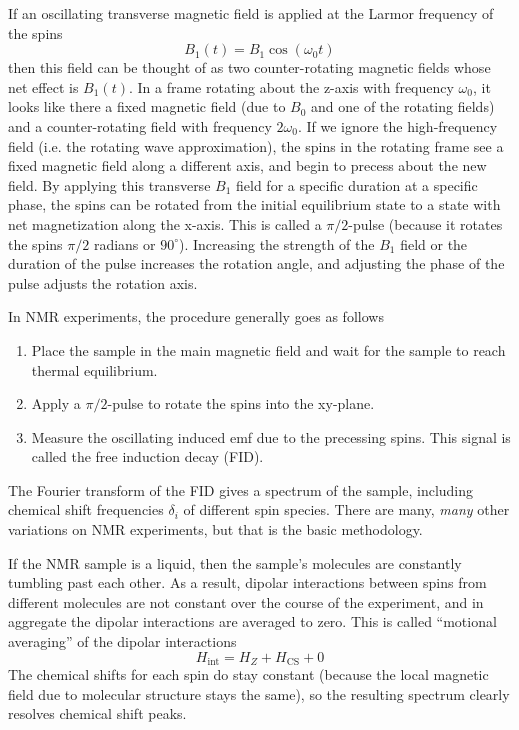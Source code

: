 If an oscillating transverse magnetic field is applied at the Larmor frequency of the spins
\[
B_1(t) = B_1 \cos(\omega_0 t)
\]
then this field can be thought of as two counter-rotating magnetic fields whose net effect is $B_1(t)$. In a frame rotating about the z-axis with frequency $\omega_0$, it looks like there a fixed magnetic field (due to $B_0$ and one of the rotating fields) and a counter-rotating field with frequency $2\omega_0$. If we ignore the high-frequency field (i.e. the rotating wave approximation), the spins in the rotating frame see a fixed magnetic field along a different axis, and begin to precess about the new field. By applying this transverse $B_1$ field for a specific duration at a specific phase,
the spins can be rotated from the initial equilibrium state to a state with net magnetization along the x-axis. This is called a $\pi/2$-pulse (because it rotates the spins $\pi/2$ radians or $90^\circ$). Increasing the strength of the $B_1$ field or the duration of the pulse increases the rotation angle, and adjusting the phase of the pulse adjusts the rotation axis.

In NMR experiments, the procedure generally goes as follows
\begin{enumerate}
    \item Place the sample in the main magnetic field and wait for the sample to reach thermal equilibrium.
    \item Apply a $\pi/2$-pulse to rotate the spins into the xy-plane.
    \item Measure the oscillating induced emf due to the precessing spins. This signal is called the free induction decay (FID).
\end{enumerate}
The Fourier transform of the FID gives a spectrum of the sample, including chemical shift frequencies $\delta_i$ of different spin species. There are many, \emph{many} other variations on NMR experiments, but that is the basic methodology.



If the NMR sample is a liquid, then the sample's molecules are constantly tumbling past each other. As a result, dipolar interactions between spins from different molecules are not constant over the course of the experiment, and in aggregate the dipolar interactions are averaged to zero. This is called ``motional averaging'' of the dipolar interactions
\[
H_{\text{int}} = H_Z + H_\text{CS} + 0
\]
The chemical shifts for each spin do stay constant (because the local magnetic field due to molecular structure stays the same), so the resulting spectrum clearly resolves chemical shift peaks.

